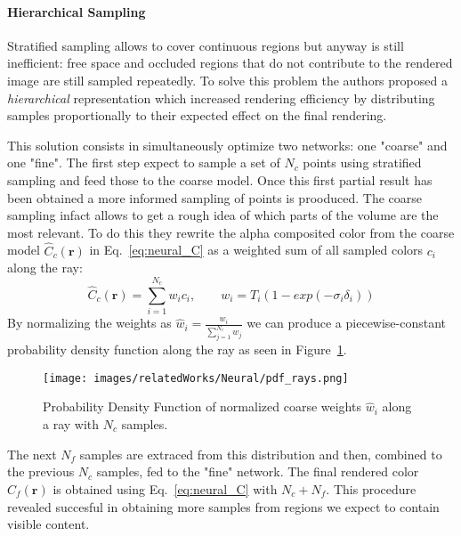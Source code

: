 \paragraph{Hierarchical Sampling} Stratified sampling allows to cover continuous
regions but anyway is still inefficient: free space and occluded regions that do not 
contribute to the rendered image are still sampled repeatedly. To solve this 
problem the authors proposed a \textit{hierarchical} representation which increased
rendering efficiency by distributing samples proportionally to their expected 
effect on the final rendering.

This solution consists in simultaneously optimize two networks: one "coarse" and
one "fine". The first step expect to sample a set of $N_c$ points using stratified 
sampling and feed those to the coarse model. Once this first partial result has 
been obtained a more informed sampling of points is prooduced. The coarse sampling 
infact allows to get a rough idea of which parts of the volume are the most relevant.
To do this they rewrite the alpha composited color from the coarse model $\hat{C}_c(\textbf{r})$
in Eq.~\ref{eq:neural_C} as a weighted sum of all sampled colors $c_i$ along the ray:
\begin{equation}
    \hat{C}_c(\textbf{r}) = \sum_{i=1}^{N_c} w_i c_i, \quad \quad w_i = T_i(1-exp(-\sigma_i \delta_i))
\end{equation}
By normalizing the weights as $\hat{w}_i = \frac{w_i}{\sum_{j=1}^{N_c}w_j}$ we can produce
a piecewise-constant probability density function along the ray as seen in Figure~\ref{fig:pdf_ray}.
\begin{figure}[t]
    \centering
    \texttt{[image: images/relatedWorks/Neural/pdf\_rays.png]} 
    \caption{Probability Density Function of normalized coarse weights $\hat{w}_i$ along a ray with $N_c$ samples.}\label{fig:pdf_ray}
\end{figure}
The next $N_f$ samples are extraced from this distribution and then, combined to the previous $N_c$ samples,
fed to the "fine" network. The final rendered color $\hat{C}_f(\textbf{r})$ is obtained using
Eq.~\ref{eq:neural_C} with $N_c+N_f$. This procedure revealed succesful in obtaining more
samples from regions we expect to contain visible content.

